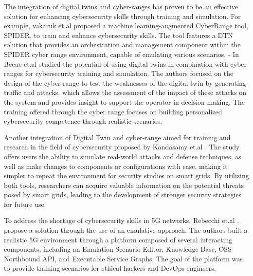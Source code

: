 The integration of digital twins and cyber-ranges has proven to be an effective solution for enhancing cybersecurity skills through training and simulation. For example, vakaruk et.al \cite{vakarukDigitalTwinNetwork2021} proposed a machine learning-augmented CyberRange tool, SPIDER, to train and enhance cybersecurity skills. The tool features a DTN solution that provides an orchestration and management component within the SPIDER cyber range environment, capable of emulating various scenarios.  
- In \cite{becueCyberFactorySecuringIndustry40with2018} Becue et.al studied the potential of using digital twins in combination with cyber ranges for cybersecurity training and simulation. The authors focused on the design of the cyber range to test the weaknesses of the digital twin by generating traffic and attacks, which allows the assessment of the impact of these attacks on the system and provides insight to support the operator in decision-making. The training offered through the cyber range focuses on building personalized cybersecurity competence through realistic scenarios.  

Another integration of Digital Twin and cyber-range aimed for training and research in the field of cybersecurity proposed by Kandasamy et.al \cite{kandasamyElectricPowerDigital2022}. The study offers users the ability to simulate real-world attacks and defense techniques, as well as make changes to components or configurations with ease, making it simpler to repeat the environment for security studies on smart grids. By utilizing both tools, researchers can acquire valuable information on the potential threats posed by smart grids, leading to the development of stronger security strategies for future use. 

To address the shortage of cybersecurity skills in 5G networks, Rebecchi et.al \cite{rebecchiDigitalTwin5G2022}, propose a solution through the use of an emulative approach. The authors built a realistic 5G environment through a platform composed of several interacting components, including an Emulation Scenario Editor, Knowledge Base, OSS Northbound API, and Executable Service Graphs. The goal of the platform was to provide training scenarios for ethical hackers and DevOps engineers.  







